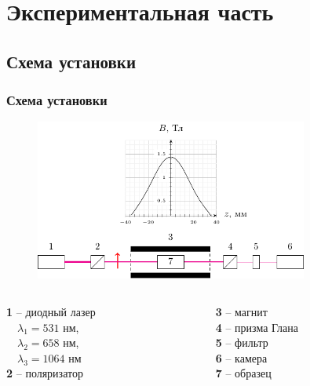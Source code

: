 \documentclass[10pt,pdf,hyperref={unicode}, dvipsnames]{beamer}
\begin{document}
\section{Экспериментальная часть}
\begin{frame}
	\subsection{Схема установки}
	\frametitle{Схема установки}
	\begin{figure}[tb]
		\centering
		\includegraphics[width=0.8\textwidth]{images/chem}
	\end{figure}
	\begin{columns}
		\hspace{2.5cm}
		\begin{column}{0.3\textwidth}
			\textbf{1} -- диодный лазер\\ 
			$\quad\lambda_1=531$ нм,\\
			$\quad\lambda_2=658$ нм,\\
			$\quad\lambda_3=1064$ нм\\
			\textbf{2} -- поляризатор
		\end{column}
		\hspace{1.6cm}
		\begin{column}{0.7\textwidth}
			\textbf{3} -- магнит\\
			\textbf{4} -- призма Глана\\
			\textbf{5} -- фильтр\\
			\textbf{6} -- камера\\
			\textbf{7} -- образец
		\end{column}
	\end{columns}
\end{frame}

\end{document}
